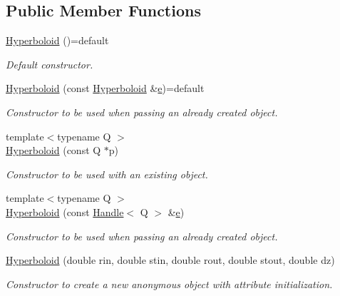 \subsection*{Public Member Functions}
\begin{DoxyCompactItemize}
\item 
\hyperlink{class_d_d4hep_1_1_geometry_1_1_hyperboloid_a52e3a903cc933750c3b530d0dfcfffc2}{Hyperboloid} ()=default
\begin{DoxyCompactList}\small\item\em Default constructor. \end{DoxyCompactList}\item 
\hyperlink{class_d_d4hep_1_1_geometry_1_1_hyperboloid_adbfe5d404f9ffdeda60a7237ef353211}{Hyperboloid} (const \hyperlink{class_d_d4hep_1_1_geometry_1_1_hyperboloid}{Hyperboloid} \&\hyperlink{_volumes_8cpp_a8a9a1f93e9b09afccaec215310e64142}{e})=default
\begin{DoxyCompactList}\small\item\em Constructor to be used when passing an already created object. \end{DoxyCompactList}\item 
{\footnotesize template$<$typename Q $>$ }\\\hyperlink{class_d_d4hep_1_1_geometry_1_1_hyperboloid_a0d59d3bfa909a4dbea70a72ed7da9c02}{Hyperboloid} (const Q $\ast$p)
\begin{DoxyCompactList}\small\item\em Constructor to be used with an existing object. \end{DoxyCompactList}\item 
{\footnotesize template$<$typename Q $>$ }\\\hyperlink{class_d_d4hep_1_1_geometry_1_1_hyperboloid_a40b3d911584cba7a8ff1029e53eaa222}{Hyperboloid} (const \hyperlink{class_d_d4hep_1_1_handle}{Handle}$<$ Q $>$ \&\hyperlink{_volumes_8cpp_a8a9a1f93e9b09afccaec215310e64142}{e})
\begin{DoxyCompactList}\small\item\em Constructor to be used when passing an already created object. \end{DoxyCompactList}\item 
\hyperlink{class_d_d4hep_1_1_geometry_1_1_hyperboloid_a1ba636fc512e1c1c1c183a8ab24db52f}{Hyperboloid} (double rin, double stin, double rout, double stout, double dz)
\begin{DoxyCompactList}\small\item\em Constructor to create a new anonymous object with attribute initialization. \end{DoxyCompactList}\item 

\end{DoxyCompactItemize}
